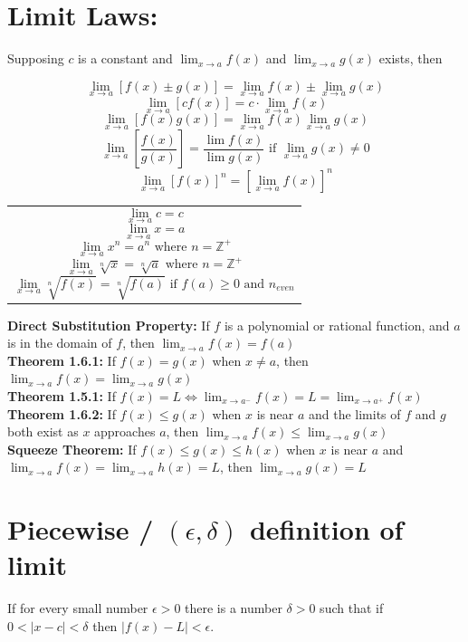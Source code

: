 \documentclass[12pt]{article}
\begin{document}
\section{Limit Laws:}
Supposing $c$ is a constant and $\lim_{x \to a}f(x)$ and $\lim_{x \to a}g(x)$ exists, then\\
\begin{minipage}{0.5\textwidth}
    $$\lim_{x \to a} [f(x) \pm g(x)] = \lim_{x \to a} f(x) \pm \lim_{x \to a} g(x)$$
    $$\lim_{x \to a} [cf(x)] = c \cdot \lim_{x \to a} f(x)$$
    $$\lim_{x \to a} [f(x)g(x)] = \lim_{x \to a} f(x) \lim_{x \to a} g(x)$$
    $$\lim_{x \to a} \left [ \frac{f(x)}{g(x)} \right ] = \frac{\lim f(x)}{\lim g(x)} \text{ if } \lim_{x \to a} g(x) \neq{} 0$$
    $$\lim_{x \to a} [f(x)]^n = [\lim_{x \to a} f(x)]^n$$

\hfill
\end{minipage}
\begin{minipage}{0.45\textwidth}
\begin{tabular}{|p{\textwidth}}
$$\lim_{x \to a} c = c$$
$$\lim_{x \to a} x = a$$
$$\lim_{x \to a} x^n = a^n \text{ where } n = \mathbb{Z}^+$$ 
$$\lim_{x \to a} \sqrt[n]{x} = \sqrt[n]{a} \text{ where } n = \mathbb{Z}^+$$ 
$$\lim_{x \to a} \sqrt[n]{f(x)} = \sqrt[n]{f(a)} \text{ if } f(a) \geq 0 \text{ and } n_{even}$$
\end{tabular}
\end{minipage}

\noindent\textbf{Direct Substitution Property:} If $f$ is a polynomial or rational function, and $a$ is in the domain of $f$, then $\lim_{x \to a} f(x) = f(a)$\\
\textbf{Theorem 1.6.1:} If $f(x) = g(x)$ when $x \neq a$, then $\lim_{x\to a} f(x) = \lim_{x\to a} g(x)$ \\
\textbf{Theorem 1.5.1:} If $f(x) = L \iff \lim_{x\to a^-} f(x) = L = \lim_{x\to a^+} f(x)$\\
\textbf{Theorem 1.6.2:} If $f(x) \leq g(x)$ when $x$ is near $a$ and the limits of $f$ and $g$ both exist as $x$ approaches $a$, then $\lim_{x\to a} f(x) \leq \lim_{x\to a} g(x)$\\
\textbf{Squeeze Theorem:} If $f(x) \leq g(x) \leq h(x)$ when $x$ is near $a$ and 
 $\lim_{x\to a} f(x) =  \lim_{x\to a} h(x) = L$, then $\lim_{x\to a} g(x) = L$


\section{Piecewise / $(\epsilon, \delta)$ definition  of limit}
If for every small number $\epsilon >  0$ there is a number $\delta > 0$ such that if $0 < |x-c| < \delta$ then $|f(x) - L| < \epsilon$.
\end{document}
